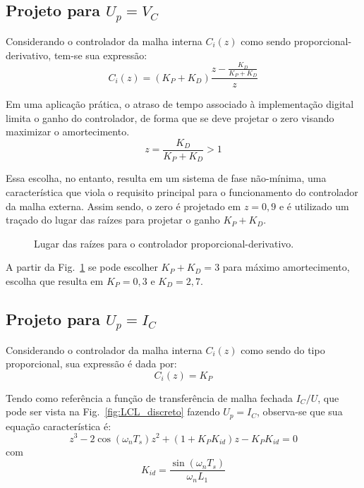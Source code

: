 \subsection{Projeto para $U_p = V_C$}

    Considerando o controlador da malha interna $C_i(z)$ como sendo proporcional-derivativo, tem-se sua expressão:
    \begin{equation}
        C_i(z) = \left( K_P + K_D \right) \frac{z- \frac{K_D}{K_P+K_D}}{z}
    \end{equation}

    Em uma aplicação prática, o atraso de tempo associado à implementação digital limita o ganho do controlador, de forma que se deve projetar o zero visando maximizar o amortecimento.
    \begin{equation}
        z = \frac{K_D}{K_P+K_D} > 1
    \end{equation}

    Essa escolha, no entanto, resulta em um sistema de fase não-mínima, uma característica que viola o requisito principal para o funcionamento do controlador da malha externa. Assim sendo, o zero é projetado em $z=0,9$ e é utilizado um traçado do lugar das raízes para projetar o ganho $K_P+K_D$.

    \begin{figure}[htb]
        \renewcommand\figurename{Fig.}
        \caption{Lugar das raízes para o controlador proporcional-derivativo.}
        \label{fig:rlocus_vc_2}
    \end{figure}

    A partir da Fig.~\ref{fig:rlocus_vc_2} se pode escolher $K_P+K_D = 3$ para máximo amortecimento, escolha que resulta em $K_P = 0,3$ e $K_D = 2,7$.


\subsection{Projeto para $U_p = I_C$}

    Considerando o controlador da malha interna $C_i(z)$ como sendo do tipo proporcional, sua expressão é dada por:
    \begin{equation}
        C_i(z) = K_P
    \end{equation}

    Tendo como referência a função de transferência de malha fechada $I_C/U$, que pode ser vista na Fig.~\ref{fig:LCL_discreto} fazendo $U_p = I_C$, observa-se que sua equação característica é:
    \begin{equation}
        z^3 - 2 \cos \left( \omega_n T_s \right) z^2 + \left( 1 + K_P K_{id} \right) z - K_P K_{id} = 0
    \end{equation}
    com
    \begin{equation}
        K_{id} = \frac{\sin(\omega_n T_s)}{\omega_n L_1}
    \end{equation}

